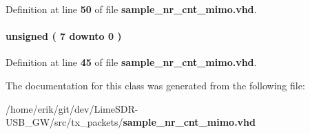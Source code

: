 Definition at line {\bf 50} of file {\bf sample\+\_\+nr\+\_\+cnt\+\_\+mimo.\+vhd}.

\paragraph[{sample\+\_\+nrcnt}]{ {\bfseries \textcolor{comment}{unsigned}\textcolor{vhdlchar}{ }\textcolor{vhdlchar}{(}\textcolor{vhdlchar}{ }\textcolor{vhdlchar}{ } \textcolor{vhdldigit}{7} \textcolor{vhdlchar}{ }\textcolor{keywordflow}{downto}\textcolor{vhdlchar}{ }\textcolor{vhdlchar}{ } \textcolor{vhdldigit}{0} \textcolor{vhdlchar}{ }\textcolor{vhdlchar}{)}\textcolor{vhdlchar}{ }} \hspace{0.3cm}{\ttfamily [Signal]}}\label{classsample__nr__cnt__mimo_1_1arch_a60a9dcb9dba6c0df48e2ca5ef2a86134}


Definition at line {\bf 45} of file {\bf sample\+\_\+nr\+\_\+cnt\+\_\+mimo.\+vhd}.



The documentation for this class was generated from the following file\+:\begin{DoxyCompactItemize}
\item 
/home/erik/git/dev/\+Lime\+S\+D\+R-\/\+U\+S\+B\+\_\+\+G\+W/src/tx\+\_\+packets/{\bf sample\+\_\+nr\+\_\+cnt\+\_\+mimo.\+vhd}\end{DoxyCompactItemize}

